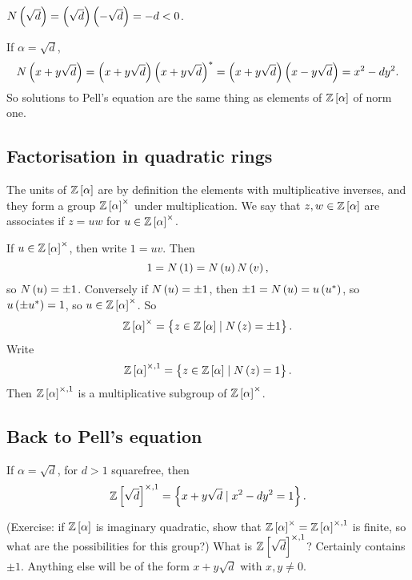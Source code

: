 \begin{example*}
$ N\br{\sqrt{d}} = \br{\sqrt{d}}\br{-\sqrt{d}} = -d < 0 $.
\end{example*}

\begin{example*}
If $ \alpha = \sqrt{d} $,
$$ N\br{x + y\sqrt{d}} = \br{x + y\sqrt{d}}\br{x + y\sqrt{d}}^* = \br{x + y\sqrt{d}}\br{x - y\sqrt{d}} = x^2 - dy^2. $$
So solutions to Pell's equation are the same thing as elements of $ \Z\sbr{\alpha} $ of norm one.
\end{example*}

\subsection{Factorisation in quadratic rings}

\begin{definition}
The units of $ \Z\sbr{\alpha} $ are by definition the elements with multiplicative inverses, and they form a group $ \Z\sbr{\alpha}^\times $ under multiplication. We say that $ z, w \in \Z\sbr{\alpha} $ are associates if $ z = uw $ for $ u \in \Z\sbr{\alpha}^\times $.
\end{definition}

If $ u \in \Z\sbr{\alpha}^\times $, then write $ 1 = uv $. Then
$$ 1 = N\br{1} = N\br{u}N\br{v}, $$
so $ N\br{u} = \pm 1 $. Conversely if $ N\br{u} = \pm 1 $, then $ \pm 1 = N\br{u} = u\br{u^*} $, so $ u\br{\pm u^*} = 1 $, so $ u \in \Z\sbr{\alpha}^\times $. So
$$ \Z\sbr{\alpha}^\times = \cbr{z \in \Z\sbr{\alpha} \mid N\br{z} = \pm 1}. $$
Write
$$ \Z\sbr{\alpha}^{\times, 1} = \cbr{z \in \Z\sbr{\alpha} \mid N\br{z} = 1}. $$
Then $ \Z\sbr{\alpha}^{\times, 1} $ is a multiplicative subgroup of $ \Z\sbr{\alpha}^\times $.

\pagebreak

\subsection{Back to Pell's equation}

\begin{example*}
If $ \alpha = \sqrt{d} $, for $ d > 1 $ squarefree, then
$$ \Z\sbr{\sqrt{d}}^{\times, 1} = \cbr{x + y\sqrt{d} \mid x^2 - dy^2 = 1}. $$
\end{example*}

(Exercise: if $ \Z\sbr{\alpha} $ is imaginary quadratic, show that $ \Z\sbr{\alpha}^\times = \Z\sbr{\alpha}^{\times, 1} $ is finite, so what are the possibilities for this group?) What is $ \Z\sbr{\sqrt{d}}^{\times, 1} $? Certainly contains $ \pm 1 $. Anything else will be of the form $ x + y\sqrt{d} $ with $ x, y \ne 0 $.

